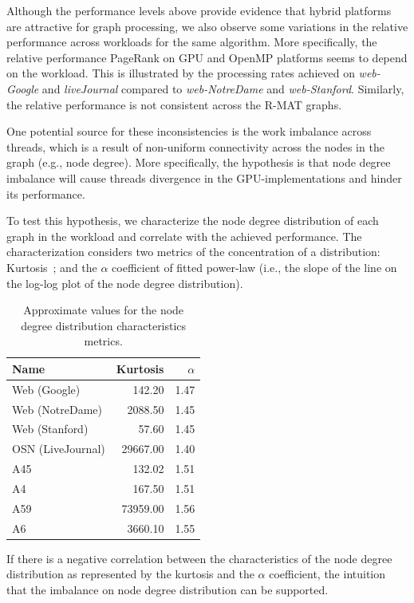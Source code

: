 Although the performance levels above provide evidence that hybrid platforms are attractive for graph processing, we also observe some variations in the relative performance across workloads for the same algorithm. More specifically, the relative performance PageRank on GPU and OpenMP platforms seems to depend on the workload. This is illustrated by the processing rates achieved on {\em web-Google} and {\em liveJournal} compared to {\em web-NotreDame} and {\em web-Stanford}. Similarly, the relative performance is not consistent across the R-MAT graphs. 

One potential source for these inconsistencies is the work imbalance across threads, which is a result of non-uniform connectivity across the nodes in the graph (e.g., node degree). More specifically, the hypothesis is that node degree imbalance will cause threads divergence in the GPU-implementations and hinder its performance. 

To test this hypothesis, we characterize the node degree distribution of each graph in the workload and correlate with the achieved performance. The characterization considers two metrics of the concentration of a distribution: Kurtosis~\cite{refstats}; and the $\alpha$ coefficient of fitted power-law (i.e., the slope of the line on the log-log plot of the node degree distribution). 

\begin{table}[ht]
\centering
\begin{tabular}{l|r|r}
Name              & Kurtosis   & $\alpha$ \\\hline
Web (Google)      & 142.20   & 1.47    \\\hline
Web (NotreDame)   & 2088.50  & 1.45    \\\hline
Web (Stanford)    & 57.60    & 1.45    \\\hline
OSN (LiveJournal) & 29667.00 & 1.40    \\\hline
A45               & 132.02  & 1.51    \\\hline
A4                & 167.50   & 1.51    \\\hline
A59               & 73959.00 & 1.56    \\\hline
A6                & 3660.10  & 1.55     \\\hline
\end{tabular}
\caption{Approximate values for the node degree distribution characteristics metrics.}
\label{tab:kurtosis}
\end{table}
            
If there is a negative correlation between the characteristics of the node degree distribution as represented by the kurtosis and the $\alpha$ coefficient, the intuition that the imbalance on node degree distribution can be supported. 

